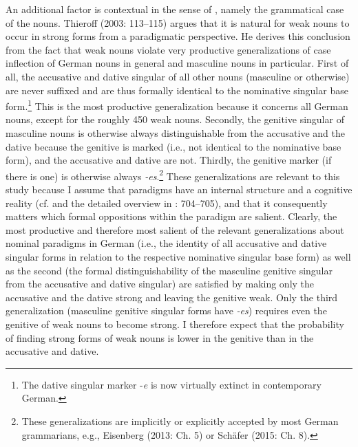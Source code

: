 \begin{styleMoutonText}
An additional factor is contextual in the sense of , namely the grammatical case of the nouns. Thieroff (2003: 113–115) argues that it is natural for weak nouns to occur in strong forms from a paradigmatic perspective. He derives this conclusion from the fact that weak nouns violate very productive generalizations of case inflection of German nouns in general and masculine nouns in particular. First of all, the accusative and dative singular of all other nouns (masculine or otherwise) are never suffixed and are thus formally identical to the nominative singular base form.\footnote{The dative singular marker \nobreakdash-\textit{e} is now virtually extinct in contemporary German.} This is the most productive generalization because it concerns all German nouns, except for the roughly 450 weak nouns. Secondly, the genitive singular of masculine nouns is otherwise always distinguishable from the accusative and the dative because the genitive is marked (i.e., not identical to the nominative base form), and the accusative and dative are not. Thirdly, the genitive marker (if there is one) is otherwise always \textit{\nobreakdash-es}.\footnote{These generalizations are implicitly or explicitly accepted by most German grammarians, e.g., Eisenberg (2013: Ch. 5) or Schäfer (2015: Ch. 8).} These generalizations are relevant to this study because I assume that paradigms have an internal structure and a cognitive reality (cf.  and the detailed overview in \citealt{NessetJanda2010}: 704–705), and that it consequently matters which formal oppositions within the paradigm are salient. Clearly, the most productive and therefore most salient of the relevant generalizations about nominal paradigms in German (i.e., the identity of all accusative and dative singular forms in relation to the respective nominative singular base form) as well as the second (the formal distinguishability of the masculine genitive singular from the accusative and dative singular) are satisfied by making only the accusative and the dative strong and leaving the genitive weak. Only the third generalization (masculine genitive singular forms have \textit{\nobreakdash-es}) requires even the genitive of weak nouns to become strong. I therefore expect that the probability of finding strong forms of weak nouns is lower in the genitive than in the accusative and dative.
\end{styleMoutonText}

